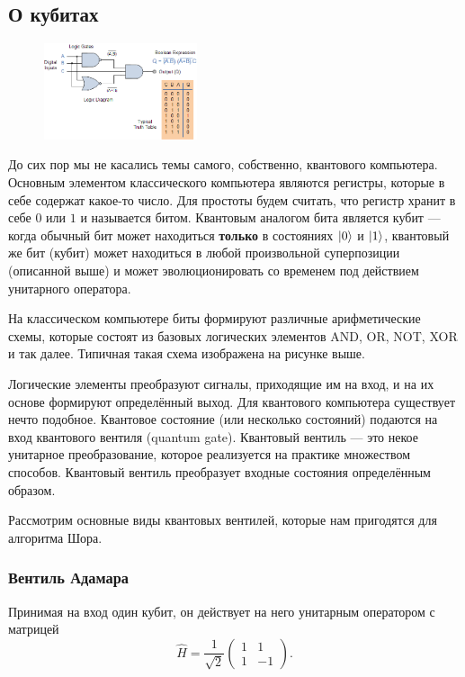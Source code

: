 \documentclass[12pt]{article}
\begin{document}
\subsection*{О кубитах}
\begin{figure}
  \begin{center}
    \includegraphics[width=0.40\textwidth]{logic.png}
  \end{center}
\end{figure}
До сих пор мы не касались темы самого, собственно, квантового компьютера. Основным элементом классического компьютера являются регистры, которые в себе содержат какое-то число. Для простоты будем считать, что регистр хранит в себе $0$ или $1$ и называется битом. Квантовым аналогом бита является кубит --- когда обычный бит может находиться {\bf только} в состояниях $\Ket{0}$ и $\Ket{1}$, квантовый же бит (кубит) может находиться в любой произвольной суперпозиции (описанной выше) и может эволюционировать со временем под действием унитарного оператора.

На классическом компьютере биты формируют различные арифметические схемы, которые состоят из базовых логических элементов AND, OR, NOT, XOR и так далее. Типичная такая схема изображена на рисунке выше.

Логические элементы преобразуют сигналы, приходящие им на вход, и на их основе формируют определённый выход. Для квантового компьютера существует нечто подобное. Квантовое состояние (или несколько состояний) подаются на вход квантового вентиля (quantum gate). Квантовый вентиль --- это некое унитарное преобразование, которое реализуется на практике множеством способов. Квантовый вентиль преобразует входные состояния определённым образом.

Рассмотрим основные виды квантовых вентилей, которые нам пригодятся для алгоритма Шора.

\subsubsection*{Вентиль Адамара}
Принимая на вход один кубит, он действует на него унитарным оператором с матрицей $$\hat{H} = \frac{1}{\sqrt{2}} \begin{pmatrix}1 & 1 \\ 1 & -1 \end{pmatrix}.$$
\end{document}
